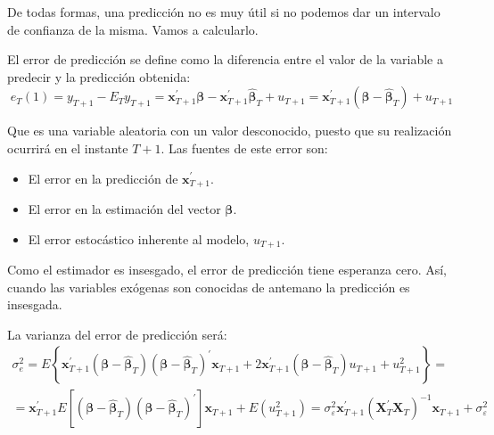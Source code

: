 De todas formas, una predicci\'on no es muy \'util si no podemos dar un
intervalo de confianza de la misma. Vamos a calcularlo.



El error de predicci\'on se define como la diferencia entre el valor
de la variable a predecir y la predicci\'on obtenida:
\begin{equation*}
e_{T}(1)=y_{T+1}-E_{T}y_{T+1}=\boldsymbol{x}^{\prime}_{T+1}\boldsymbol{\beta}-\boldsymbol{x}^{\prime}_{T+1}\hat{\boldsymbol{\beta}}_{T}+u_{T+1}=\boldsymbol{x}^{\prime}_{T+1}\left(\boldsymbol{\beta}-\hat{\boldsymbol{\beta}}_{T}\right)+u_{T+1}
\end{equation*}


Que es una variable aleatoria con un valor desconocido, puesto que
su realizaci\'on ocurrir\'a en el instante $T+1$. Las fuentes de este
error son:
\begin{itemize}
\item El error en la predicci\'on de $\boldsymbol{x}^{\prime}_{T+1}$.
\item El error en la estimaci\'on del vector $\boldsymbol{\beta}$.
\item El error estoc\'astico inherente al modelo, $u_{T+1}$.
\end{itemize}
Como el estimador es insesgado, el error de predicci\'on tiene esperanza
cero. As\'i, cuando las variables ex\'ogenas son conocidas de antemano
la predicci\'on es insesgada.

La varianza del error de predicci\'on ser\'a: 
\begin{equation*}
\begin{array}{c}
\sigma_{e}^{2}=E\left\{ \boldsymbol{x}^{\prime}_{T+1}\left(\boldsymbol{\beta}-\hat{\boldsymbol{\beta}}_{T}\right)\left(\boldsymbol{\beta}-\hat{\boldsymbol{\beta}}_{T}\right)^{\prime}\boldsymbol{x}{}_{T+1}+2\boldsymbol{x}^{\prime}_{T+1}\left(\boldsymbol{\beta}-\hat{\boldsymbol{\beta}}_{T}\right)u_{T+1}+u_{T+1}^{2}\right\} =\\
=\boldsymbol{x}^{\prime}_{T+1}E\left[\left(\boldsymbol{\beta}-\hat{\boldsymbol{\beta}}_{T}\right)\left(\boldsymbol{\beta}-\hat{\boldsymbol{\beta}}_{T}\right)^{\prime}\right]\boldsymbol{x}{}_{T+1}+E\left(u_{T+1}^{2}\right)=\sigma_{\varepsilon}^{2}\boldsymbol{x}^{\prime}_{T+1}\left(\boldsymbol{X}_{T}^{\prime}\boldsymbol{X}_{T}\right)^{-1}\boldsymbol{x}{}_{T+1}+\sigma_{\varepsilon}^{2}
\end{array}
\end{equation*}


